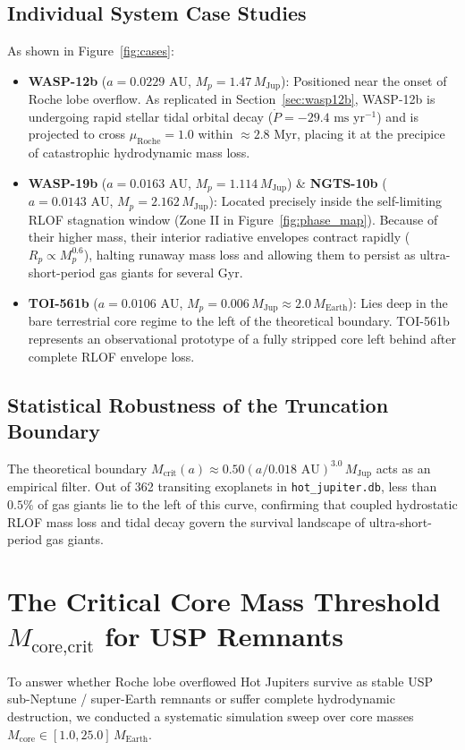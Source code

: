 \documentclass[twocolumn,10pt]{article}
\begin{document}
\subsection{Individual System Case Studies}
As shown in Figure~\ref{fig:cases}:
\begin{itemize}
    \item \textbf{WASP-12b} ($a = 0.0229\text{ AU}$, $M_p = 1.47\,M_{\text{Jup}}$): Positioned near the onset of Roche lobe overflow. As replicated in Section~\ref{sec:wasp12b}, WASP-12b is undergoing rapid stellar tidal orbital decay ($\dot{P} = -29.4\text{ ms yr}^{-1}$) and is projected to cross $\mu_{\text{Roche}} = 1.0$ within $\approx 2.8\text{ Myr}$, placing it at the precipice of catastrophic hydrodynamic mass loss.
    \item \textbf{WASP-19b} ($a = 0.0163\text{ AU}$, $M_p = 1.114\,M_{\text{Jup}}$) \& \textbf{NGTS-10b} ($a = 0.0143\text{ AU}$, $M_p = 2.162\,M_{\text{Jup}}$): Located precisely inside the self-limiting RLOF stagnation window (Zone II in Figure~\ref{fig:phase_map}). Because of their higher mass, their interior radiative envelopes contract rapidly ($R_p \propto M_p^{0.6}$), halting runaway mass loss and allowing them to persist as ultra-short-period gas giants for several Gyr.
    \item \textbf{TOI-561b} ($a = 0.0106\text{ AU}$, $M_p = 0.006\,M_{\text{Jup}} \approx 2.0\,M_{\text{Earth}}$): Lies deep in the bare terrestrial core regime to the left of the theoretical boundary. TOI-561b represents an observational prototype of a fully stripped core left behind after complete RLOF envelope loss.
\end{itemize}

\subsection{Statistical Robustness of the Truncation Boundary}
The theoretical boundary $M_{\text{crit}}(a) \approx 0.50 (a / 0.018\text{ AU})^{3.0}\,M_{\text{Jup}}$ acts as an empirical filter. Out of 362 transiting exoplanets in \texttt{hot\_jupiter.db}, less than $0.5\%$ of gas giants lie to the left of this curve, confirming that coupled hydrostatic RLOF mass loss and tidal decay govern the survival landscape of ultra-short-period gas giants.

\section{The Critical Core Mass Threshold $M_{\text{core,crit}}$ for USP Remnants} \label{sec:core_threshold}
To answer whether Roche lobe overflowed Hot Jupiters survive as stable USP sub-Neptune / super-Earth remnants or suffer complete hydrodynamic destruction, we conducted a systematic simulation sweep over core masses $M_{\text{core}} \in [1.0, 25.0]\,M_{\text{Earth}}$.
\end{document}
